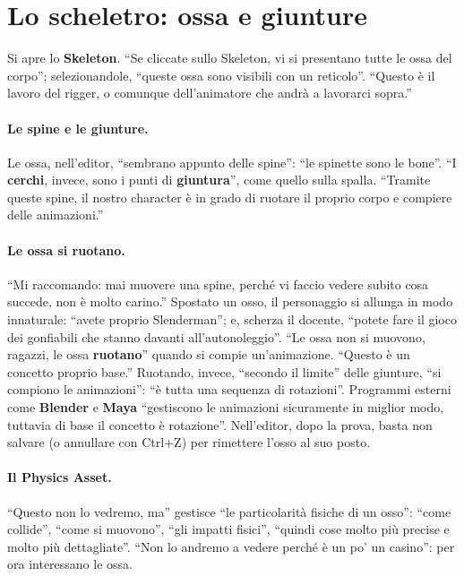 \section{Lo scheletro: ossa e giunture}
\label{ue8:sec:skeleton}

Si apre lo \textbf{Skeleton}. ``Se cliccate sullo Skeleton, vi si presentano tutte le
ossa del corpo''; selezionandole, ``queste ossa sono visibili con un reticolo''. ``Questo
è il lavoro del rigger, o comunque dell'animatore che andrà a lavorarci sopra.''

\paragraph{Le spine e le giunture.} Le ossa, nell'editor, ``sembrano appunto delle
spine'': ``le spinette sono le bone''. ``I \textbf{cerchi}, invece, sono i punti di
\textbf{giuntura}'', come quello sulla spalla. ``Tramite queste spine, il nostro character
è in grado di ruotare il proprio corpo e compiere delle animazioni.''

\paragraph{Le ossa si ruotano.} ``Mi raccomando: mai muovere una spine, perché vi faccio
vedere subito cosa succede, non è molto carino.'' Spostato un osso, il personaggio si
allunga in modo innaturale: ``avete proprio Slenderman''; e, scherza il docente,
``potete fare il gioco dei gonfiabili che stanno davanti all'autonoleggio''. ``Le ossa
non si muovono, ragazzi, le ossa \textbf{ruotano}'' quando si compie un'animazione.
``Questo è un concetto proprio base.'' Ruotando, invece, ``secondo il limite'' delle
giunture, ``si compiono le animazioni'': ``è tutta una sequenza di rotazioni''. Programmi
esterni come \textbf{Blender} e \textbf{Maya} ``gestiscono le animazioni sicuramente in
miglior modo, tuttavia di base il concetto è rotazione''. Nell'editor, dopo la prova,
basta non salvare (o annullare con Ctrl+Z) per rimettere l'osso al suo posto.

\paragraph{Il Physics Asset.} ``Questo non lo vedremo, ma'' gestisce ``le particolarità
fisiche di un osso'': ``come collide'', ``come si muovono'', ``gli impatti fisici'',
``quindi cose molto più precise e molto più dettagliate''. ``Non lo andremo a vedere
perché è un po' un casino'': per ora interessano le ossa.

